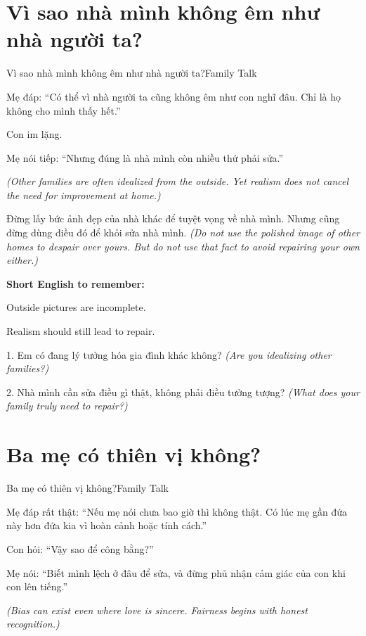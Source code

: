 \section{Vì sao nhà mình không êm như nhà người ta?}
\begin{truyen}{Vì sao nhà mình không êm như nhà người ta?}{Family Talk}

Mẹ đáp: ``Có thể vì nhà người ta cũng không êm như con nghĩ đâu. Chỉ là họ không cho mình thấy hết.''

Con im lặng.

Mẹ nói tiếp: ``Nhưng đúng là nhà mình còn nhiều thứ phải sửa.''

\textit{(Other families are often idealized from the outside. Yet realism does not cancel the need for improvement at home.)}
\end{truyen}

\begin{baihoc}
Đừng lấy bức ảnh đẹp của nhà khác để tuyệt vọng về nhà mình. Nhưng cũng đừng dùng điều đó để khỏi sửa nhà mình.
\textit{(Do not use the polished image of other homes to despair over yours. But do not use that fact to avoid repairing your own either.)}
\end{baihoc}

\begin{ghinhoanh}
\textbf{Short English to remember:}

Outside pictures are incomplete.

Realism should still lead to repair.
\end{ghinhoanh}

\begin{tuhocnhanh}
1. Em có đang lý tưởng hóa gia đình khác không? \textit{(Are you idealizing other families?)}

2. Nhà mình cần sửa điều gì thật, không phải điều tưởng tượng? \textit{(What does your family truly need to repair?)}
\end{tuhocnhanh}
\ngancach

\section{Ba mẹ có thiên vị không?}
\begin{truyen}{Ba mẹ có thiên vị không?}{Family Talk}

Mẹ đáp rất thật: ``Nếu mẹ nói chưa bao giờ thì không thật. Có lúc mẹ gần đứa này hơn đứa kia vì hoàn cảnh hoặc tính cách.''

Con hỏi: ``Vậy sao để công bằng?''

Mẹ nói: ``Biết mình lệch ở đâu để sửa, và đừng phủ nhận cảm giác của con khi con lên tiếng.''

\textit{(Bias can exist even where love is sincere. Fairness begins with honest recognition.)}
\end{truyen}

